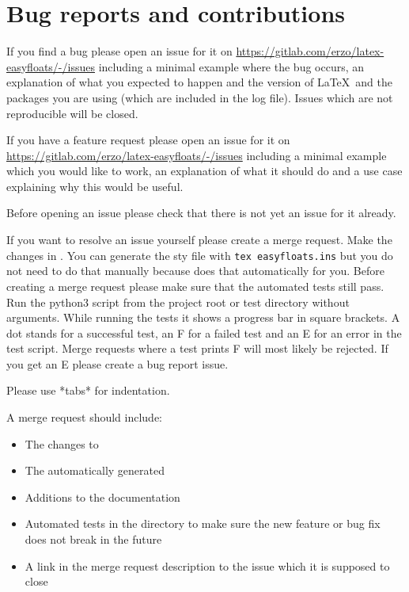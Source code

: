 
\section{Bug reports and contributions}
\label{bug-reports-and-contributions}

If you find a bug please open an issue for it
on \url{https://gitlab.com/erzo/latex-easyfloats/-/issues}
including a minimal example where the bug occurs,
an explanation of what you expected to happen
and the version of \LaTeX\ and the packages you are using (which are included in the log file).
Issues which are not reproducible will be closed.

If you have a feature request please open an issue for it
on \url{https://gitlab.com/erzo/latex-easyfloats/-/issues}
including a minimal example which you would like to work,
an explanation of what it should do
and a use case explaining why this would be useful.

Before opening an issue please check that there is not yet an issue for it already.

If you want to resolve an issue yourself please create a merge request.
Make the changes in .
You can generate the sty file with \verb|tex easyfloats.ins|
but you do not need to do that manually because  does that automatically for you.
Before creating a merge request please make sure that the automated tests still pass.
Run the python3 script  from the project root or test directory without arguments.
While running the tests it shows a progress bar in square brackets.
A dot stands for a successful test, an F for a failed test and an E for an error in the test script.
Merge requests where a test prints F will most likely be rejected.
If you get an E please create a bug report issue.

Please use *tabs* for indentation.

A merge request should include:
\begin{itemize}
\item The changes to 
\item The automatically generated 
\item Additions to the documentation
\item Automated tests in the  directory to make sure the new feature or bug fix does not break in the future
\item A link in the merge request description to the issue which it is supposed to close
\end{itemize}

